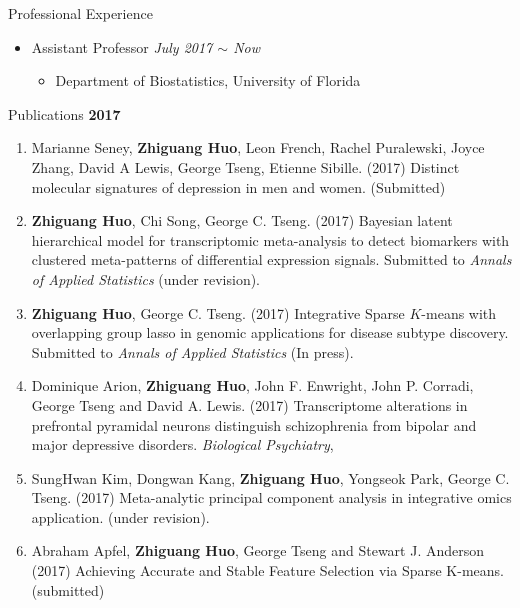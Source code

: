\documentclass{resume} %
\begin{document}
\begin{rSection}{Professional Experience}
\begin{itemize}[noitemsep,topsep=0pt]
\item Assistant Professor
        \hfill {\em July 2017 $\sim$ Now} 
        \begin{itemize}
        \item Department of Biostatistics, University of Florida
        \end{itemize}
\end{itemize}
\end{rSection}

\begin{rSection}{Publications}
\textbf{2017}
\begin{enumerate}[noitemsep,topsep=0pt]
\item Marianne Seney,  {\bf Zhiguang Huo}, Leon French, Rachel Puralewski, Joyce Zhang, David A Lewis, George Tseng, Etienne Sibille. (2017) 
Distinct molecular signatures of depression in men and women. (Submitted)

\item {\bf Zhiguang Huo}, Chi Song, George C. Tseng. (2017)
Bayesian latent hierarchical model for transcriptomic meta-analysis to detect biomarkers with clustered meta-patterns of differential expression signals. Submitted to \emph{Annals of Applied Statistics} (under revision).

\item {\bf Zhiguang Huo}, George C. Tseng. (2017)
    Integrative Sparse $K$-means with overlapping group lasso in genomic applications for disease subtype discovery.
Submitted to \emph{Annals of Applied Statistics} (In press).

    \item  Dominique Arion, {\bf Zhiguang Huo}, John F. Enwright, John P. Corradi, George Tseng and David A. Lewis. (2017)
Transcriptome alterations in prefrontal pyramidal neurons distinguish schizophrenia from bipolar and major depressive disorders.
\emph{Biological Psychiatry}, 

\item SungHwan Kim, Dongwan Kang, {\bf Zhiguang Huo}, Yongseok
Park, George C. Tseng. (2017)
Meta-analytic principal component analysis in integrative omics application.
(under revision).

\item Abraham Apfel,  {\bf Zhiguang Huo}, George Tseng and Stewart J. Anderson (2017)
Achieving Accurate and Stable Feature Selection via Sparse K-means. (submitted)



\end{enumerate}
\end{rSection}
\end{document}
